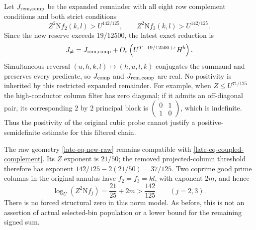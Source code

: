 \documentclass[11pt]{article}
\theoremstyle{definition}
\newcommand{\N}{\mathrm N}
\newcommand{\eps}{\varepsilon}
\begin{document}
Let $J_{\rm rem,comp}$ be the expanded remainder with all eight row
complement conditions and both strict conditions
\begin{equation}
 Z^2\N f_2(k,l)>U^{142/125},\qquad
 Z^2\N f_3(k,l)>U^{142/125}.
 \label{late-eq-coupled-complement}
\end{equation}
Since the new reserve exceeds $19/12500$, the latest exact reduction
is
\begin{equation}
 J_{\ne}=J_{\rm rem,comp}
   +O_\eps\left(U^{T-19/12500+\eps}H^b\right).
 \label{late-eq-latest-remainder}
\end{equation}
Simultaneous reversal $(u,h,k,l)\mapsto(h,u,l,k)$ conjugates the
summand and preserves every predicate, so $J_{\rm comp}$ and
$J_{\rm rem,comp}$ are real.  No positivity is inherited by this
restricted expanded remainder.  For example, when $Z\le U^{71/125}$
the high-conductor column filter has zero diagonal; if it admits an
off-diagonal pair, its corresponding $2$ by $2$ principal block is
$\left(\begin{smallmatrix}0&1\\1&0\end{smallmatrix}\right)$,
which is indefinite.  Thus the positivity of the original cubic
probe cannot justify a positive-semidefinite estimate for this
filtered chain.

The raw geometry \eqref{late-eq-new-raw} remains compatible with
\eqref{late-eq-coupled-complement}.  Its $Z$ exponent is $21/50$;
the removed projected-column threshold therefore has exponent
$142/125-2(21/50)=37/125$.  Two coprime good prime columns in the
original annulus have $f_2=f_3=kl$, with exponent $2m$, and hence
\[
 \log_U(Z^2\N f_j)=\frac{21}{25}+2m>\frac{142}{125}
 \qquad(j=2,3).
\]
There is no forced structural zero in this norm model.  As before,
this is not an assertion of actual selected-bin population or a lower
bound for the remaining signed sum.
\end{document}
